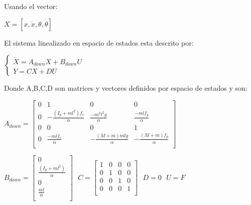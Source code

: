 \setlength{\parskip}{0.4cm}
Usando el vector:
\begin{center}
$X=[x,\dot{x},\theta,\dot{\theta}]$\\
\end{center}

El sistema linealizado en espacio de estados esta descrito por:

\begin{center}

$
\left\lbrace
\begin{array}{ll}
\dot{X}=A_{down}X+B_{down}U\\
Y=CX+DU
\end{array}
\right.
$

\end{center}
\setlength{\parskip}{0.4cm}

Donde A,B,C,D son matrices y vectores definidos por espacio de estados y son:


\begin{center}
$
A_{down}=\left[
\begin{array}{cccc}
0 & 1 & 0 & 0 \\
0 & -\frac{(I_{p}+ml^{2})f_{c}}{\alpha} & \frac{-m^{2}l^{2}g}{\alpha} & \frac{-mlf_{p}}{\alpha} \\
0 & 0 & 0 & 1 \\
0 & \frac{-mlf_{c}}{\alpha} & -\frac{(M+m)mlg}{\alpha} & -\frac{(M+m)f_{p}}{\alpha}\\
\end{array}
\right]
$
\end{center}

\begin{center}
$
B_{down}=\left[
\begin{array}{c}
0  \\
 \frac{(I_{p}+ml^{2})}{\alpha}\\
0 \\
\frac{ml}{\alpha} \\
\end{array}
\right]
\hspace{8pt}
C=\left[
\begin{array}{cccc}
1 & 0 & 0 & 0 \\
0 & 1 & 0 & 0 \\
0 & 0 & 1 & 0 \\
0 & 0 & 0 & 1 \\
\end{array}
\right]
\hspace{8pt}
D= 0
\hspace{8pt}
U= F
$
\end{center}

